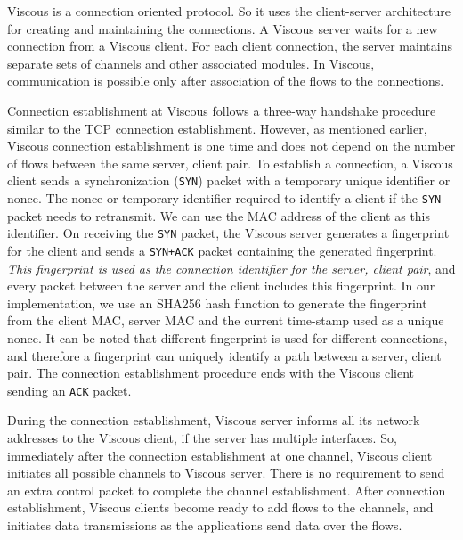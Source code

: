 Viscous is a connection oriented protocol. So it uses the client-server architecture for creating and maintaining the connections. A Viscous server waits for a new connection from a Viscous client. 
For each client connection, the server maintains separate sets of channels and other associated modules. In Viscous, communication is possible only after association of the flows to the connections.  


Connection establishment at Viscous follows a three-way handshake procedure similar to the TCP connection establishment. However, as mentioned earlier, Viscous connection establishment is one time and does not depend on the number of flows between the same server, client pair. To establish a connection, a Viscous client sends a synchronization (\texttt{SYN}) packet with a temporary unique identifier or nonce. The nonce or temporary identifier required to identify a client if the \texttt{SYN} packet needs to retransmit. We can use the MAC address of the client as this identifier. On receiving the \texttt{SYN} packet, the Viscous server generates a fingerprint for the client and sends a \texttt{SYN+ACK} packet containing the generated fingerprint. \textit{This fingerprint is used as the connection identifier for the server, client pair}, and every packet between the server and the client includes this fingerprint. In our implementation, we use an SHA256 hash function to generate the fingerprint from the client MAC, server MAC and the current time-stamp used as a unique nonce. It can be noted that different fingerprint is used for different connections, and therefore a fingerprint can uniquely identify a path between a server, client pair. The connection establishment procedure ends with the Viscous client sending an \texttt{ACK} packet. 

During the connection establishment, Viscous server informs all its network addresses to the Viscous client, if the server has multiple interfaces. So, immediately after the connection establishment at one channel, Viscous client initiates all possible channels to Viscous server. There is no requirement to send an extra control packet to complete the channel establishment. After connection establishment, Viscous clients become ready to add flows to the channels, and initiates data transmissions as the applications send data over the flows.

